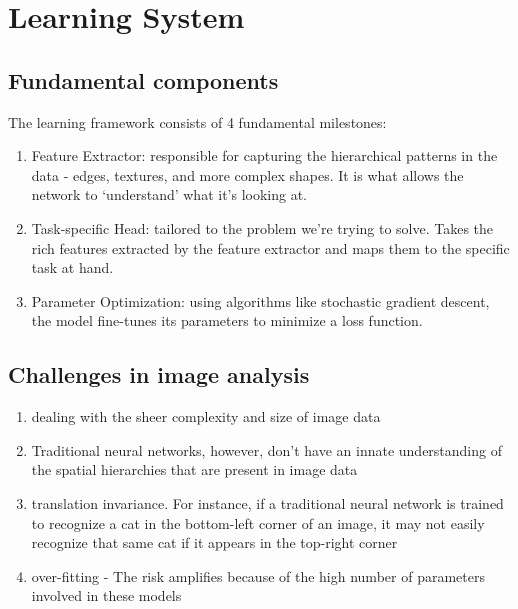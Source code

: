 \documentclass[11pt]{article}
\begin{document}


\tableofcontents

\clearpage

\section{Learning System}

\subsection{Fundamental components}

The learning framework consists of 4 fundamental milestones:

\begin{enumerate}
    \item Feature Extractor: responsible for capturing the hierarchical patterns in the data - edges, textures, and more complex shapes. It is what allows the network to `understand' what it's looking at.
    \item Task-specific Head: tailored to the problem we're trying to solve. Takes the rich features extracted by the feature extractor and maps them to the specific task at hand.
    \item Parameter Optimization: using algorithms like stochastic gradient descent, the model fine-tunes its parameters to minimize a loss function.
\end{enumerate}

\subsection{Challenges in image analysis}

\begin{enumerate}
    \item dealing with the sheer complexity and size of image data
    \item Traditional neural networks, however, don't have an innate understanding of the spatial hierarchies that are present in image data
    \item translation invariance. For instance, if a traditional neural network is trained to recognize a cat in the bottom-left corner of an image, it may not easily recognize that same cat if it appears in the top-right corner
    \item over-fitting - The risk amplifies because of the high number of parameters involved in these models
\end{enumerate}
\end{document}
